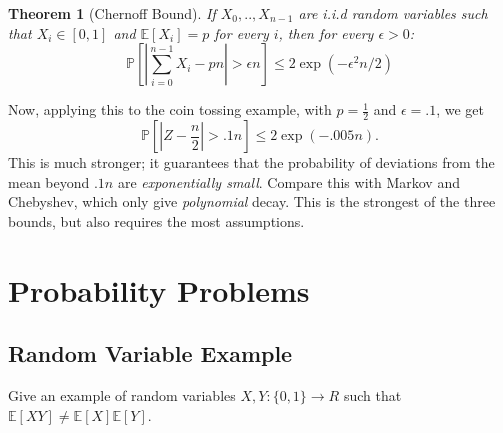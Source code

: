 \documentclass[11pt]{article}
\newif\ifsolutions
\newtheorem{theorem}{Theorem}
\theoremstyle{definition}
\newtheorem*{solution}{Solution}
\begin{document}
\begin{itemize}
\begin{theorem}[Chernoff Bound]
 If $X_0,..,X_{n-1}$ are i.i.d random variables such that $X_i \in [0,1]$ and $\mathbb{E} [X_i] = p$ for every $i$, then for every $\epsilon > 0$: 
\[\mathbb{P} [|\sum_{i=0}^{n-1} X_i -pn | > \epsilon n] \leq 2 \exp(- \epsilon^2 n/2)\] 
\end{theorem}

Now, applying this to the coin tossing example, with $p = \frac{1}{2}$ and $\epsilon = .1$, we get
\[
\mathbb{P} [|Z -\frac{n}{2} | > .1 n] \leq 2 \exp(- .005n).
\]
This is much stronger; it guarantees that the probability of deviations from the mean beyond $.1n$ are \emph{exponentially small}. Compare this with Markov and Chebyshev, which only give \emph{polynomial} decay. This is the strongest of the three bounds, but also requires the most assumptions.

\end{itemize}

\section{Probability Problems}

\subsection{Random Variable Example}


Give an example of random variables $X, Y : \{0, 1\} \rightarrow R$ such that $\mathbb{E} [XY] \neq \mathbb{E} [X] \mathbb{E} [Y]$. \\

\ifsolutions
\color{blue}
\begin{solution}
This is just any case where two variables are not independent. \\

For example, take $X = Y = x_0$, where $x_0$ is the result of the coin flip. 

Then, we get that $\mathbb{E} [f(x)] = \sum_k \mathbb{P} (X = k ) \cdot f(k)$. \\

Then we can calculate the left hand side of the equation, $\mathbb{E} [X^2] = (1/2)\cdot (0^2) + (1/2) (1^2) = 1/2$. \\

Now to calculate the right hand side of the equation, $\mathbb{E} [X] \cdot \mathbb{E} [X] = 1/2 \cdot 1/2 = 1/4$. \\

Therefore, $\mathbb{E} [XY] \neq \mathbb{E} [X] \mathbb{E} [Y]$, where X = Y.
\end{solution}
\color{black}
\else
\vspace{0.75in}
\fi
\end{document}
